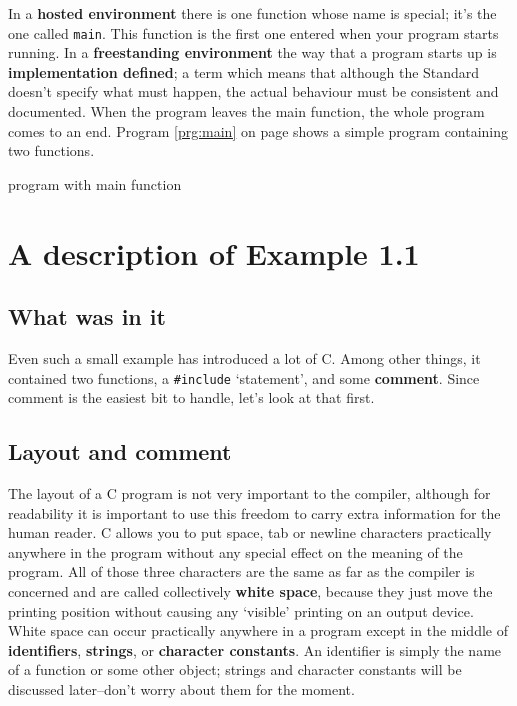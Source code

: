   In a \textbf{hosted environment} there is one function whose name is
   special; it's the one called \texttt{main}. This function is the first
   one entered when your program starts running. In a \textbf{freestanding
   environment} the way that a program starts up is \textbf{implementation
   defined}; a term which means that although the Standard doesn't specify
   what must happen, the actual behaviour must be consistent and
   documented. When the program leaves the main function, the whole program
   comes to an end.
   Program \ref{prg:main} on page \pageref{prg:main}
   shows a simple program containing two functions. 


   \begin{program}[phtb]
     \caption{\label{prg:main}program with main function}
   \end{program}


 
   \section{A description of Example 1.1}


   \subsection{What was in it}
   

   Even such a small example has introduced a lot of C. Among other
    things, it contained two functions, a \texttt{\#include}
    `statement', and some \textbf{comment}. Since comment is the
    easiest bit to handle, let's look at that first.


  

  \subsection{Layout and comment}
   

   The layout of a C program is not very important to the compiler, although
    for readability it is important to use this freedom to carry extra
    information for the human reader. C allows you to put space, tab or newline
    characters practically anywhere in the program without any special effect
    on the meaning of the program. All of those three characters are the same
    as far as the compiler is concerned and are called collectively \textbf{white
    space}, because they just move the printing position without causing
    any `visible' printing on an output device. White space can occur
    practically anywhere in a program except in the middle of
    \textbf{identifiers}, \textbf{strings}, or \textbf{character
    constants}. An identifier is simply the name of a function or some
    other object; strings and character constants will be discussed
    later--don't worry about them for the moment.


